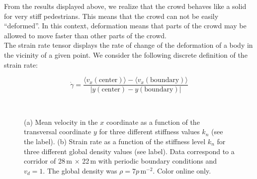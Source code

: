 \documentclass[preprint,12pt]{elsarticle}
\begin{document}
From the results displayed above, we realize that the crowd behaves like a solid
for very stiff pedestrians. This means that the crowd can not be easily
``deformed''. In this context, deformation means that parts of the crowd may be
allowed to move faster than other parts of the crowd. \\

The strain rate tensor displays the rate of change of the deformation of a body
in the vicinity of a given point.  We consider the following discrete definition
of the strain rate:

\begin{equation}
\dot{\gamma} = \frac{\langle v_x(\mathrm{center})\rangle
 - \langle v_x(\mathrm{boundary})\rangle }{\left | y(\mathrm{center}) 
 - y(\mathrm{boundary}) \right |} 
\end{equation}


\begin{figure}[!htbp]
\centering
{}\ 
\\

\caption[width=0.47\columnwidth]{(a) Mean velocity in the $x$ coordinate as a 
function of the transversal coordinate $y$ for three different stiffness values 
$k_n$ (see the label). (b) Strain rate as a function of the stiffness level 
$k_n$ for three different global density values (see label). Data correspond to 
a corridor of 28$\,$m $\times$ 22$\,$m with periodic boundary conditions and 
$v_d=1$. The global density was $\rho=7 p\,$m$^{-2}$. Color online only. }
\label{profile_strain}
\end{figure}
\end{document}
